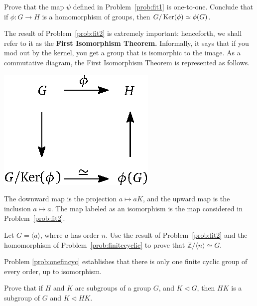 \begin{problem}\label{prob:fit2}
Prove that the map \(\psi\) defined in Problem~\ref{prob:fit1} is one-to-one.  Conclude that if \(\phi: G\longrightarrow H\) is a homomorphism of groups, then  \(G/\operatorname{Ker}(\phi) \simeq \phi(G)\).
\begin{annotation}
\end{annotation}
\end{problem}

The result of Problem~\ref{prob:fit2} is extremely important: henceforth, we shall refer to it as the \textbf{First Isomorphism Theorem.}
Informally, it says that if you mod out by the kernel, you get a group that is isomorphic to the image. As a commutative diagram, the First Isomorphism Theorem is represented as follows.
\begin{center}
\includegraphics{fit.eps}
\end{center}

The downward map is the projection \(a \mapsto aK\), and the upward map is the inclusion \(a \mapsto a\). The map labeled as an isomorphism is the map considered in Problem~\ref{prob:fit2}.

\begin{problem}\label{prob:onefincyc}
Let $G = \langle a \rangle$, where $a$ has order $n$. Use the result of Problem~\ref{prob:fit2} and the homomorphism of Problem~\ref{prob:finitecyclic}
to prove that \(\mathbb{Z}/\langle n \rangle \simeq G\).
\end{problem}

Problem \ref{prob:onefincyc} establishes that there is only one finite cyclic group of every order, up to isomorphism.

\begin{problem}\label{prob:hksubgroup}
Prove that if \(H\) and \(K\) are subgroups of a group \(G\), and \(K \lhd G\), then \(HK\)  is a subgroup of \(G\) and \(K \lhd HK\).
\begin{annotation}
\end{annotation}
\end{problem}

